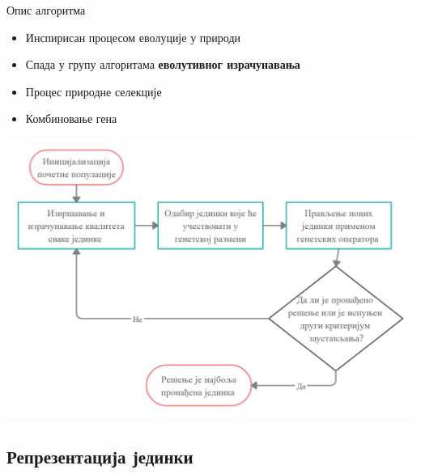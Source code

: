 \documentclass{beamer}
\begin{document}
\begin{frame}{Опис алгоритма}
    \begin{itemize}
        \item Инспирисан процесом еволуције у природи
        \item Спада у групу алгоритама \textbf{еволутивног  израчунавања}	
        \item Процес природне селекције
        \item Комбиновање гена
    \end{itemize}
    \begin{center}
        \includegraphics[scale=0.14]{opsti_algoritam.png}
    \end{center}
\end{frame}
    
\subsection[Репрезентација јединки]{Репрезентација јединки}
\end{document}
